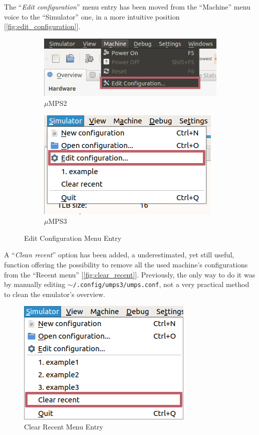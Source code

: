 \documentclass[12pt,a4paper,openright,twoside]{report}
\begin{document}
The ``\textit{Edit configuration}'' menu entry has been moved from the ``Machine'' menu voice to the ``Simulator'' one, in a more intuitive position [\autoref{fig:edit_configuration}].
\clearpage
\begin{figure}[h]
	\centering
	\begin{subfigure}[h]{\textwidth}
		\centering
		\includegraphics[scale=0.75]{edit_configuration_old}
		\caption{$\mu$MPS2}
		\label{fig:edit_configuration_old}
	\end{subfigure}
	\newline
	\begin{subfigure}[h]{\textwidth}
		\centering
		\includegraphics[scale=0.75]{edit_configuration}
		\caption{$\mu$MPS3}
		\label{fig:edit_configuration_new}
	\end{subfigure}
	\caption{Edit Configuration Menu Entry}
	\label{fig:edit_configuration}
\end{figure}

A ``\textit{Clean recent}'' option has been added, a underestimated, yet still useful, function offering the possibility to remove all the used machine's configurations from the ``Recent menu'' [\autoref{fig:clear_recent}].
Previously, the only way to do it was by manually editing \texttt{$\sim$/.config/umps3/umps.conf}, not a very practical method to clean the emulator's overview.
\begin{figure}[h]
	\centering
	\includegraphics[scale=0.75]{clear_recent}
	\caption{Clear Recent Menu Entry}
	\label{fig:clear_recent}
\end{figure}
\end{document}
